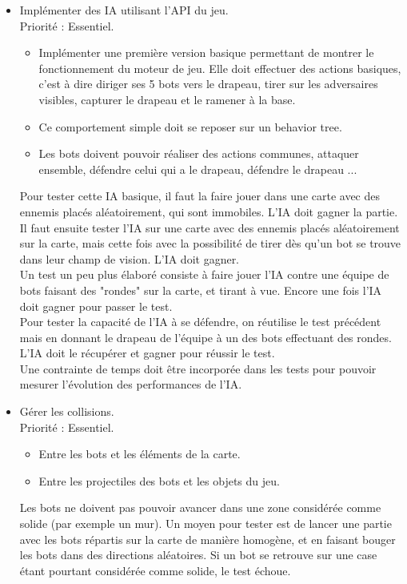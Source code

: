 \documentclass[french]{article}
\begin{document}
\begin{itemize}
        \item Implémenter des IA utilisant l'API du jeu. \\
            Priorité : Essentiel.
            \begin{itemize}
                \item Implémenter une première version basique permettant de montrer le fonctionnement du moteur de jeu. Elle doit effectuer des actions basiques, c'est à dire diriger ses 5 bots vers le drapeau,
                tirer sur les adversaires visibles, capturer le drapeau et le ramener à la base.
                \item Ce comportement simple doit se reposer sur un behavior tree\cite{colledanchise2017behavior}.
                \item Les bots doivent pouvoir réaliser des actions communes, attaquer ensemble, défendre celui qui a le drapeau, défendre le drapeau ... 
            \end{itemize}
            Pour tester cette IA basique, il faut la faire jouer dans une carte avec des ennemis placés aléatoirement, qui sont immobiles. L'IA doit gagner la partie.\\
            Il faut ensuite tester l'IA sur une carte avec des ennemis placés aléatoirement sur la carte, mais cette fois avec la possibilité de tirer dès qu'un bot se trouve dans leur champ de vision. L'IA doit gagner. \\
            Un test un peu plus élaboré consiste à faire jouer l'IA contre une équipe de bots faisant des "rondes" sur la carte, et tirant à vue. Encore une fois l'IA doit gagner pour passer le test.\\
            Pour tester la capacité de l'IA à se défendre, on réutilise le test précédent mais en donnant le drapeau de l'équipe à un des bots effectuant des rondes. L'IA doit le récupérer et gagner pour réussir le test.\\
            Une contrainte de temps doit être incorporée dans les tests pour pouvoir mesurer l'évolution des performances de l'IA. \\


        \item Gérer les collisions. \\
                Priorité : Essentiel.
                \begin{itemize}
                    \item Entre les bots et les éléments de la carte.
                    \item Entre les projectiles des bots et les objets du jeu.
                \end{itemize}
                Les bots ne doivent pas pouvoir avancer dans une zone considérée comme solide (par exemple un mur). Un moyen pour tester est de lancer une partie avec les bots répartis sur la carte de manière homogène, et en faisant bouger les bots dans des directions aléatoires. Si un bot se retrouve sur une case étant pourtant considérée comme solide, le test échoue.\\
                

\end{itemize}
\end{document}
